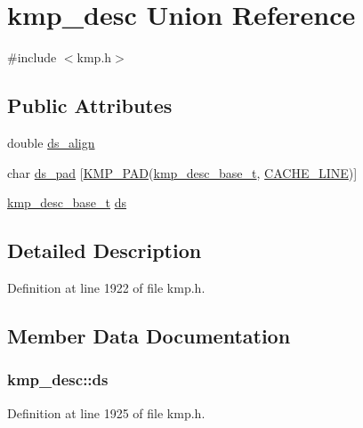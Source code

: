 \hypertarget{unionkmp__desc}{\section{kmp\-\_\-desc Union Reference}
\label{unionkmp__desc}
}


{\ttfamily \#include $<$kmp.\-h$>$}

\subsection*{Public Attributes}
\begin{DoxyCompactItemize}
\item 
double \hyperlink{unionkmp__desc_a07ddc184d874a557a32e0a840768c046}{ds\-\_\-align}
\item 
char \hyperlink{unionkmp__desc_a45b5eb29d9e37aba9ac0f8e618097a2a}{ds\-\_\-pad} \mbox{[}\hyperlink{kmp__lock_8h_a7e782410115489f45ab1686c39a2bb89}{K\-M\-P\-\_\-\-P\-A\-D}(\hyperlink{kmp_8h_a5e7f01f0708353f8e3c3f977dce55eb5}{kmp\-\_\-desc\-\_\-base\-\_\-t}, \hyperlink{kmp__os_8h_a86194c659a2d795e5f5949d293ae4661}{C\-A\-C\-H\-E\-\_\-\-L\-I\-N\-E})\mbox{]}
\item 
\hyperlink{kmp_8h_a5e7f01f0708353f8e3c3f977dce55eb5}{kmp\-\_\-desc\-\_\-base\-\_\-t} \hyperlink{unionkmp__desc_aebfb0f1186b63f19217a552941275fa4}{ds}
\end{DoxyCompactItemize}


\subsection{Detailed Description}


Definition at line 1922 of file kmp.\-h.



\subsection{Member Data Documentation}
\hypertarget{unionkmp__desc_aebfb0f1186b63f19217a552941275fa4}{
\subsubsection[{ds}]{ kmp\-\_\-desc\-::ds}}\label{unionkmp__desc_aebfb0f1186b63f19217a552941275fa4}


Definition at line 1925 of file kmp.\-h.

